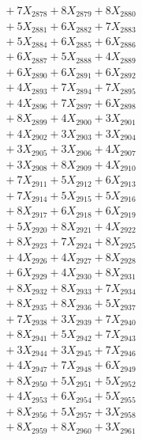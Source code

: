 \documentclass[a4paper,10pt]{article}
\begin{document}
{\begin{align}
&\;  + 7 X_{2878} + 8 X_{2879} + 8 X_{2880} \\[0.3ex]
&\;  + 5 X_{2881} + 6 X_{2882} + 7 X_{2883} \\[0.3ex]
&\;  + 5 X_{2884} + 6 X_{2885} + 6 X_{2886} \\[0.3ex]
&\;  + 6 X_{2887} + 5 X_{2888} + 4 X_{2889} \\[0.5ex]\allowbreak
&\;  + 6 X_{2890} + 6 X_{2891} + 6 X_{2892} \\[0.3ex]
&\;  + 4 X_{2893} + 7 X_{2894} + 7 X_{2895} \\[0.3ex]
&\;  + 4 X_{2896} + 7 X_{2897} + 6 X_{2898} \\[0.3ex]
&\;  + 8 X_{2899} + 4 X_{2900} + 3 X_{2901} \\[0.3ex]
&\;  + 4 X_{2902} + 3 X_{2903} + 3 X_{2904} \\[0.3ex]
&\;  + 3 X_{2905} + 3 X_{2906} + 4 X_{2907} \\[0.3ex]
&\;  + 3 X_{2908} + 8 X_{2909} + 4 X_{2910} \\[0.3ex]
&\;  + 7 X_{2911} + 5 X_{2912} + 6 X_{2913} \\[0.3ex]
&\;  + 7 X_{2914} + 5 X_{2915} + 5 X_{2916} \\[0.3ex]
&\;  + 8 X_{2917} + 6 X_{2918} + 6 X_{2919} \\[0.5ex]\allowbreak
&\;  + 5 X_{2920} + 8 X_{2921} + 4 X_{2922} \\[0.3ex]
&\;  + 8 X_{2923} + 7 X_{2924} + 8 X_{2925} \\[0.3ex]
&\;  + 4 X_{2926} + 4 X_{2927} + 8 X_{2928} \\[0.3ex]
&\;  + 6 X_{2929} + 4 X_{2930} + 8 X_{2931} \\[0.3ex]
&\;  + 8 X_{2932} + 8 X_{2933} + 7 X_{2934} \\[0.3ex]
&\;  + 8 X_{2935} + 8 X_{2936} + 5 X_{2937} \\[0.3ex]
&\;  + 7 X_{2938} + 3 X_{2939} + 7 X_{2940} \\[0.3ex]
&\;  + 8 X_{2941} + 5 X_{2942} + 7 X_{2943} \\[0.3ex]
&\;  + 3 X_{2944} + 3 X_{2945} + 7 X_{2946} \\[0.3ex]
&\;  + 4 X_{2947} + 7 X_{2948} + 6 X_{2949} \\[0.5ex]\allowbreak
&\;  + 8 X_{2950} + 5 X_{2951} + 5 X_{2952} \\[0.3ex]
&\;  + 4 X_{2953} + 6 X_{2954} + 5 X_{2955} \\[0.3ex]
&\;  + 8 X_{2956} + 5 X_{2957} + 3 X_{2958} \\[0.3ex]
&\;  + 8 X_{2959} + 8 X_{2960} + 3 X_{2961} \\[0.3ex]

\end{align}}
\end{document}
